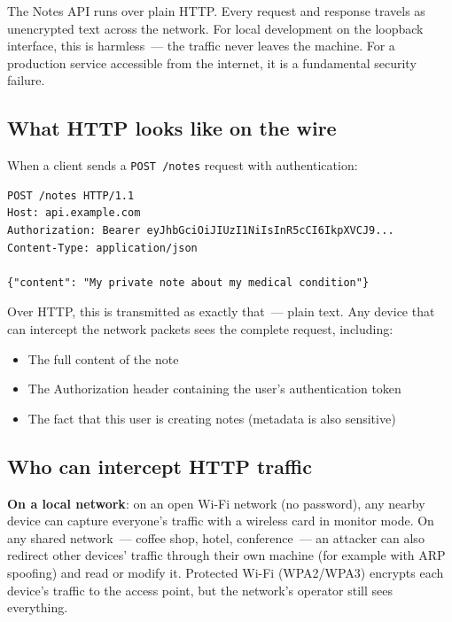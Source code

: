 The Notes API runs over plain HTTP. Every request and response travels as unencrypted text across the network. For local development on the loopback interface, this is harmless~--- the traffic never leaves the machine. For a production service accessible from the internet, it is a fundamental security failure.

\subsection*{What HTTP looks like on the wire}\label{11-reliability-security-gaps:what-http-looks-like-on-the-wire}

When a client sends a \texttt{POST\ /notes} request with authentication:

\begin{outputbox}[short]
\begin{Verbatim}[fontsize=\codesize, breaklines, breakanywhere, breaksymbolleft={\tiny\textcolor{muted}{$\hookrightarrow$}}]
POST /notes HTTP/1.1
Host: api.example.com
Authorization: Bearer eyJhbGciOiJIUzI1NiIsInR5cCI6IkpXVCJ9...
Content-Type: application/json

{"content": "My private note about my medical condition"}
\end{Verbatim}
\end{outputbox}

\noindent{}Over HTTP, this is transmitted as exactly that~--- plain text. Any device that can intercept the network packets sees the complete request, including:

\begin{itemize}
\tightlist
\item
  The full content of the note
\item
  The Authorization header containing the user's authentication token
\item
  The fact that this user is creating notes (metadata is also sensitive)
\end{itemize}

\subsection*{Who can intercept HTTP traffic}\label{11-reliability-security-gaps:who-can-intercept-http-traffic}

\textbf{On a local network}: on an open Wi-Fi network (no password), any nearby device can capture everyone's traffic with a wireless card in monitor mode. On any shared network~--- coffee shop, hotel, conference~--- an attacker can also redirect other devices' traffic through their own machine (for example with ARP spoofing) and read or modify it. Protected Wi-Fi (WPA2/WPA3) encrypts each device's traffic to the access point, but the network's operator still sees everything.

